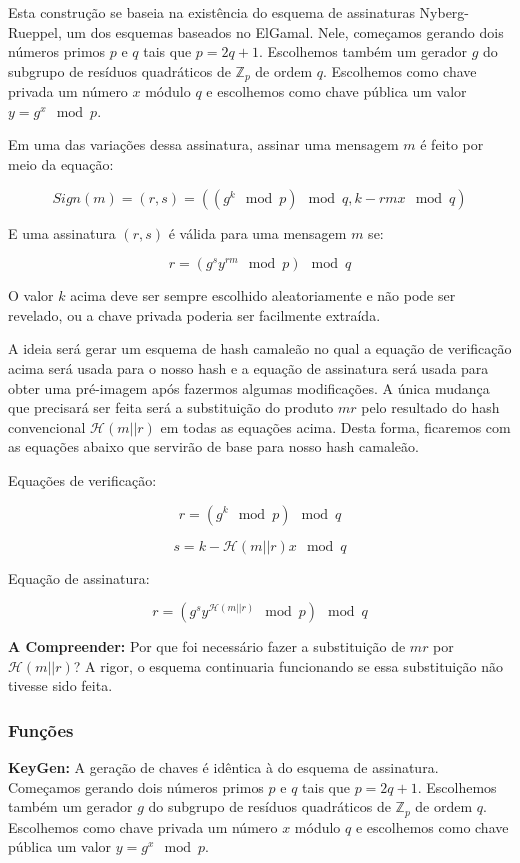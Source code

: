 \documentclass[a4paper]{article}
\begin{document}
    Esta construção se baseia na existência do esquema de assinaturas
    Nyberg-Rueppel, um dos esquemas baseados no ElGamal. Nele, começamos
    gerando dois números primos $p$ e $q$ tais que $p=2q+1$. Escolhemos
    também um gerador $g$ do subgrupo de resíduos quadráticos de
    $\mathbb{Z}_p$ de ordem $q$. Escolhemos como chave privada um número
    $x$ módulo $q$ e escolhemos como chave pública um valor $y=g^x \mod
    p$.
    
    Em uma das variações dessa assinatura, assinar uma mensagem $m$ é
    feito por meio da equação:
    
    $$
    Sign(m) = (r, s) = ((g^k \mod p) \mod q, k-rmx \mod q)
    $$
    
    E uma assinatura $(r, s)$ é válida para uma mensagem $m$ se:
    
    $$
    r = (g^sy^{rm} \mod p) \mod q
    $$
    
    O valor $k$ acima deve ser sempre escolhido aleatoriamente e não pode
    ser revelado, ou a chave privada poderia ser facilmente extraída.
    
    A ideia será gerar um esquema de hash camaleão no qual a equação de
    verificação acima será usada para o nosso hash e a equação de
    assinatura será usada para obter uma pré-imagem após fazermos algumas
    modificações. A única mudança que precisará ser feita será a
    substituição do produto $mr$ pelo resultado do hash convencional
    $\mathcal{H}(m||r)$ em todas as equações acima. Desta forma, ficaremos
    com as equações abaixo que servirão de base para nosso hash camaleão.
    
    Equações de verificação:
    
    $$
    r = (g^k \mod p) \mod q
    $$
    
    $$
    s = k-\mathcal{H}(m||r)x \mod q
    $$
    
    Equação de assinatura:
    
    $$
    r = (g^sy^{\mathcal{H}(m||r)} \mod p) \mod q
    $$
    
    \textbf{A Compreender: }Por que foi necessário fazer a substituição de
    $mr$ por $\mathcal{H}(m||r)$? A rigor, o esquema continuaria
    funcionando se essa substituição não tivesse sido feita.
    
    \subsubsection{Funções}
    
    \textbf{KeyGen: }A geração de chaves é idêntica à do esquema de
    assinatura. Começamos gerando dois números primos $p$ e $q$ tais que
    $p=2q+1$. Escolhemos também um gerador $g$ do subgrupo de resíduos
    quadráticos de $\mathbb{Z}_p$ de ordem $q$. Escolhemos como chave
    privada um número $x$ módulo $q$ e escolhemos como chave pública um
    valor $y=g^x \mod p$.
    
\end{document}

